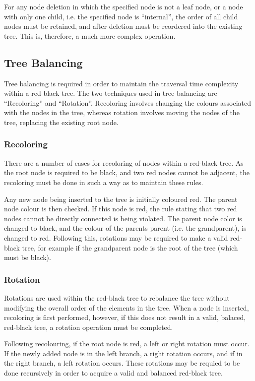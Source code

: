 For any node deletion in which the specified node is not a leaf node, or a node
with only one child, i.e. the specified node is ``internal'', the order of all
child nodes must be retained, and after deletion must be reordered into the
existing tree\cite{geeksDelete}. This is, therefore, a much more complex operation.

\subsection{Tree Balancing}

Tree balancing is required in order to maintain the traversal time complexity
within a red-black tree. The two techniques used in tree balancing are
``Recoloring'' and ``Rotation''. Recoloring involves changing the colours
associated with the nodes in the tree, whereas rotation involves moving the
nodes of the tree, replacing the existing root node.

\subsubsection{Recoloring}

There are a number of cases for recoloring of nodes within a red-black tree. As
the root node is required to be black, and two red nodes cannot be adjacent,
the recoloring must be done in such a way as to maintain these rules.

Any new node being inserted to the tree is initially coloured red. The parent
node colour is then checked. If this node is red, the rule stating that two red
nodes cannot be directly connected is being violated. The parent node color is
changed to black, and the colour of the parents parent (i.e. the grandparent),
is changed to red. Following this, rotations may be required to make a valid
red-black tree, for example if the grandparent node is the root of the tree
(which must be black)\cite{geeksInsert}.

\subsubsection{Rotation}

Rotations are used within the red-black tree to rebalance the tree without
modifying the overall order of the elements in the tree. When a node is
inserted, recoloring is first performed, however, if this does not result in a
valid, balaced, red-black tree, a rotation operation must be completed.

Following recolouring, if the root node is red, a left or right rotation must
occur. If the newly added node is in the left branch, a right rotation occurs,
and if in the right branch, a left rotation occurs\cite{geeksInsert}.
These rotations may be
requied to be done recursively in order to acquire a valid and balanced red-black tree.
